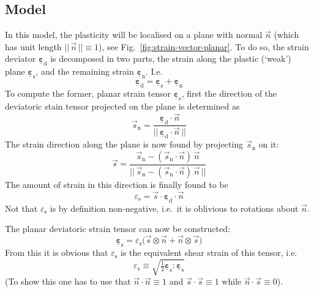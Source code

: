 \documentclass[times,namecite]{goose-article}
\newcommand\T[1]{\underline{\bm{{#1}}}}
\begin{document}
\subsection{Model}

In this model, the plasticity will be localised on a plane with normal $\vec{n}$ (which has unit length $||\, \vec{n} \,|| \equiv 1$), see Fig.~\ref{fig:strain-vector-planar}. To do so, the strain deviator $\T{\varepsilon}_\mathrm{d}$ is decomposed in two parts, the strain along the plastic (`weak') plane $\T{\varepsilon}_\mathrm{s}$, and the remaining strain $\T{\varepsilon}_\mathrm{n}$. I.e.
\begin{equation}\label{eq:planar:strain:decomposition}
  \T{\varepsilon}_\mathrm{d} = \T{\varepsilon}_\mathrm{s} + \T{\varepsilon}_\mathrm{n}
\end{equation}
To compute the former, planar strain tensor $\T{\varepsilon}_\mathrm{s}$, first the direction of the deviatoric stain tensor projected on the plane is determined as
\begin{equation}
  \vec{s}_\mathrm{n} =
  \frac{
    \T{\varepsilon}_\mathrm{d} \cdot \vec{n}
  }
  {
    ||\, \T{\varepsilon}_\mathrm{d} \cdot \vec{n} \,||
  }
\end{equation}
The strain direction along the plane is now found by projecting $\vec{s}_\mathrm{n}$ on it:
\begin{equation}
  \vec{s} =
  \frac{
    \vec{s}_\mathrm{n} - ( \vec{s}_\mathrm{n} \cdot \vec{n} )\, \vec{n}
  }
  {
    ||\, \vec{s}_\mathrm{n} - ( \vec{s}_\mathrm{n} \cdot \vec{n} )\, \vec{n} \,||
  }
\end{equation}
The amount of strain in this direction is finally found to be
\begin{equation}
  \varepsilon_\mathrm{s} = \vec{s} \cdot \T{\varepsilon}_\mathrm{d} \cdot \vec{n}
\end{equation}
Not that $\varepsilon_\mathrm{s}$ is by definition non-negative, i.e.\ it is oblivious to rotations about $\vec{n}$.

The planar deviatoric strain tensor can now be constructed:
\begin{equation}
  \T{\varepsilon}_\mathrm{s} = \varepsilon_\mathrm{s}
  \big(
    \vec{s} \otimes \vec{n} + \vec{n} \otimes \vec{s}
  \big)
\end{equation}
From this it is obvious that $\varepsilon_\mathrm{s}$ is the equivalent shear strain of this tensor, i.e.
\begin{equation}
  \varepsilon_\mathrm{s}
  \equiv
  \sqrt{ \tfrac{1}{2} \T{\varepsilon}_\mathrm{s} : \T{\varepsilon}_\mathrm{s} }
\end{equation}
(To show this one has to use that $\vec{n} \cdot \vec{n} \equiv 1$ and $\vec{s} \cdot \vec{s} \equiv 1$ while $\vec{n} \cdot \vec{s} \equiv 0$).
\end{document}
